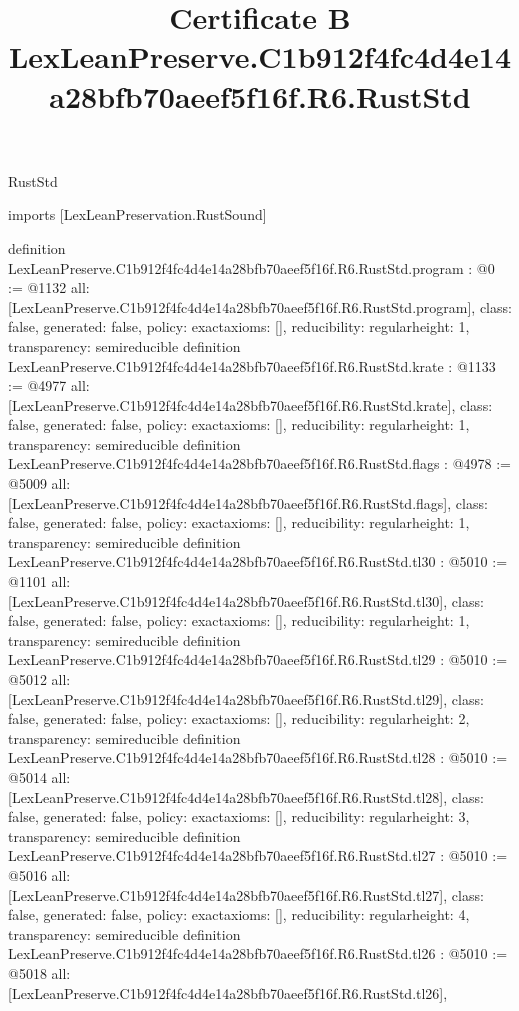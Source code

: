 \begin{lexlean}{RustStd}
\title{Certificate B LexLeanPreserve.C1b912f4fc4d4e14a28bfb70aeef5f16f.R6.RustStd}
\begin{coremodule}
imports [LexLeanPreservation.RustSound]

definition LexLeanPreserve.C1b912f4fc4d4e14a28bfb70aeef5f16f.R6.RustStd.program : @0 := @1132 {
  all: [LexLeanPreserve.C1b912f4fc4d4e14a28bfb70aeef5f16f.R6.RustStd.program],
  class: false,
  generated: false,
  policy: exact{axioms: []},
  reducibility: regular{height: 1},
  transparency: semireducible
}
definition LexLeanPreserve.C1b912f4fc4d4e14a28bfb70aeef5f16f.R6.RustStd.krate : @1133 := @4977 {
  all: [LexLeanPreserve.C1b912f4fc4d4e14a28bfb70aeef5f16f.R6.RustStd.krate],
  class: false,
  generated: false,
  policy: exact{axioms: []},
  reducibility: regular{height: 1},
  transparency: semireducible
}
definition LexLeanPreserve.C1b912f4fc4d4e14a28bfb70aeef5f16f.R6.RustStd.flags : @4978 := @5009 {
  all: [LexLeanPreserve.C1b912f4fc4d4e14a28bfb70aeef5f16f.R6.RustStd.flags],
  class: false,
  generated: false,
  policy: exact{axioms: []},
  reducibility: regular{height: 1},
  transparency: semireducible
}
definition LexLeanPreserve.C1b912f4fc4d4e14a28bfb70aeef5f16f.R6.RustStd.tl30 : @5010 := @1101 {
  all: [LexLeanPreserve.C1b912f4fc4d4e14a28bfb70aeef5f16f.R6.RustStd.tl30],
  class: false,
  generated: false,
  policy: exact{axioms: []},
  reducibility: regular{height: 1},
  transparency: semireducible
}
definition LexLeanPreserve.C1b912f4fc4d4e14a28bfb70aeef5f16f.R6.RustStd.tl29 : @5010 := @5012 {
  all: [LexLeanPreserve.C1b912f4fc4d4e14a28bfb70aeef5f16f.R6.RustStd.tl29],
  class: false,
  generated: false,
  policy: exact{axioms: []},
  reducibility: regular{height: 2},
  transparency: semireducible
}
definition LexLeanPreserve.C1b912f4fc4d4e14a28bfb70aeef5f16f.R6.RustStd.tl28 : @5010 := @5014 {
  all: [LexLeanPreserve.C1b912f4fc4d4e14a28bfb70aeef5f16f.R6.RustStd.tl28],
  class: false,
  generated: false,
  policy: exact{axioms: []},
  reducibility: regular{height: 3},
  transparency: semireducible
}
definition LexLeanPreserve.C1b912f4fc4d4e14a28bfb70aeef5f16f.R6.RustStd.tl27 : @5010 := @5016 {
  all: [LexLeanPreserve.C1b912f4fc4d4e14a28bfb70aeef5f16f.R6.RustStd.tl27],
  class: false,
  generated: false,
  policy: exact{axioms: []},
  reducibility: regular{height: 4},
  transparency: semireducible
}
definition LexLeanPreserve.C1b912f4fc4d4e14a28bfb70aeef5f16f.R6.RustStd.tl26 : @5010 := @5018 {
  all: [LexLeanPreserve.C1b912f4fc4d4e14a28bfb70aeef5f16f.R6.RustStd.tl26],
}
\end{coremodule}
\end{lexlean}
